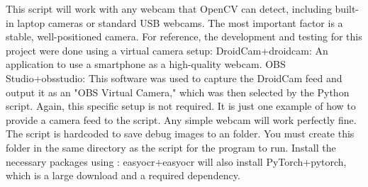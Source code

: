 \markdownRendererUlEndTight \markdownRendererInterblockSeparator
{}
\markdownRendererSectionEnd \markdownRendererSectionBegin
{}\markdownRendererInterblockSeparator
{}This script will work with any webcam that OpenCV can detect, including built-in laptop cameras or standard USB webcams. The most important factor is a stable, well-positioned camera.\markdownRendererParagraphSeparator
{}For reference, the development and testing for this project were done using a virtual camera setup:\markdownRendererInterblockSeparator
{}\markdownRendererUlBegin
\markdownRendererUlItem DroidCam+{}{}{droidcam}: An application to use a smartphone as a high-quality webcam.\markdownRendererUlItemEnd 
\markdownRendererUlItem OBS Studio+{}{}{obsstudio}: This software was used to capture the DroidCam feed and output it as an "OBS Virtual Camera," which was then selected by the Python script.\markdownRendererUlItemEnd 
\markdownRendererUlEnd \markdownRendererInterblockSeparator
{}Again, this specific setup is not required. It is just one example of how to provide a camera feed to the script. Any simple webcam will work perfectly fine.\markdownRendererInterblockSeparator
{}
\markdownRendererSectionEnd \markdownRendererSectionBegin
{}\markdownRendererInterblockSeparator
{}\markdownRendererUlBegin
\markdownRendererUlItem {}\markdownRendererSoftLineBreak
{}The script is hardcoded to save debug images to an  folder. You must create this folder in the same directory as the script for the program to run.\markdownRendererInterblockSeparator
{}\markdownRendererUlItemEnd 
\markdownRendererUlItem {}\markdownRendererSoftLineBreak
{}Install the necessary packages using :\markdownRendererInterblockSeparator
{}\markdownRendererInterblockSeparator
{}\markdownRendererBlockQuoteBegin
{} easyocr+{}{}{easyocr} will also install PyTorch+{}{}{pytorch}, which is a large download and a required dependency.\markdownRendererBlockQuoteEnd \markdownRendererUlItemEnd 
